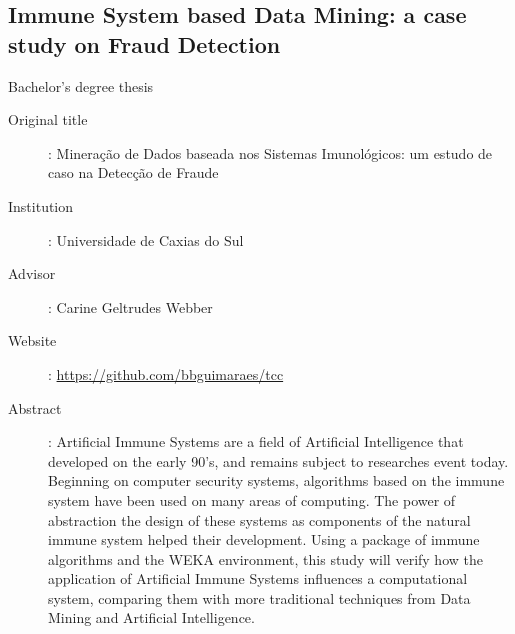 \subsection*{Immune System based Data Mining: a case study on Fraud Detection}

Bachelor's degree thesis

\begin{description}
    \item[Original title]:
        Mineração de Dados baseada nos Sistemas Imunológicos: um estudo de caso
        na Detecção de Fraude
    \item[Institution]: Universidade de Caxias do Sul
    \item[Advisor]: Carine Geltrudes Webber
    \item[Website]: \url{https://github.com/bbguimaraes/tcc}
    \item[Abstract]:
        Artificial Immune Systems are a field of Artificial Intelligence that
        developed on the early 90's, and remains subject to researches event
        today.  Beginning on computer security systems, algorithms based on the
        immune system have been used on many areas of computing. The power of
        abstraction the design of these systems as components of the natural
        immune system helped their development. Using a package of immune
        algorithms and the WEKA environment, this study will verify how the
        application of Artificial Immune Systems influences a computational
        system, comparing them with more traditional techniques from Data
        Mining and Artificial Intelligence.
\end{description}
